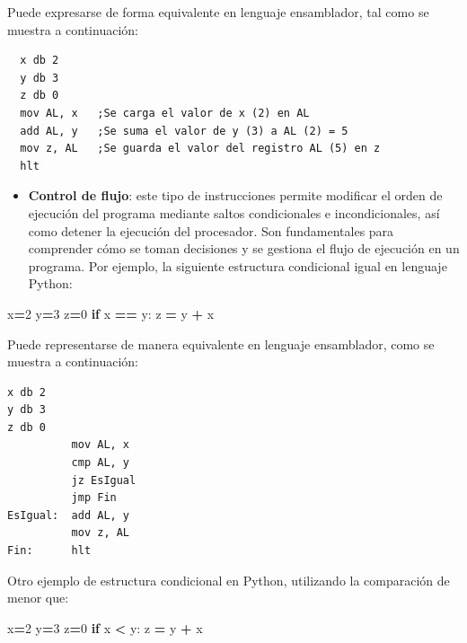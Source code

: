 \documentclass[12pt,oneside]{templates/unerthesis}
\newenvironment{Shaded}{\begin{snugshade}}{\end{snugshade}}
\newcommand{\ControlFlowTok}[1]{\textcolor[rgb]{0.13,0.29,0.53}{\textbf{#1}}}
\newcommand{\DecValTok}[1]{\textcolor[rgb]{0.00,0.00,0.81}{#1}}
\newcommand{\NormalTok}[1]{#1}
\newcommand{\OperatorTok}[1]{\textcolor[rgb]{0.81,0.36,0.00}{\textbf{#1}}}
\providecommand{\tightlist}{%
  \setlength{\itemsep}{0pt}\setlength{\parskip}{0pt}}
\begin{document}
Puede expresarse de forma equivalente en lenguaje ensamblador, tal como se muestra a continuación:

\begin{lstlisting}
  x db 2
  y db 3
  z db 0
  mov AL, x   ;Se carga el valor de x (2) en AL
  add AL, y   ;Se suma el valor de y (3) a AL (2) = 5
  mov z, AL   ;Se guarda el valor del registro AL (5) en z 
  hlt\end{lstlisting}

\begin{itemize}
\tightlist
\item
  \textbf{Control de flujo}: este tipo de instrucciones permite modificar el orden de ejecución del programa mediante saltos condicionales e incondicionales, así como detener la ejecución del procesador. Son fundamentales para comprender cómo se toman decisiones y se gestiona el flujo de ejecución en un programa. Por ejemplo, la siguiente estructura condicional igual en lenguaje Python:
\end{itemize}

\begin{Shaded}
\begin{Highlighting}[]
\NormalTok{x}\OperatorTok{=}\DecValTok{2}
\NormalTok{y}\OperatorTok{=}\DecValTok{3}
\NormalTok{z}\OperatorTok{=}\DecValTok{0}
\ControlFlowTok{if}\NormalTok{ x }\OperatorTok{==}\NormalTok{ y:}
\NormalTok{  z }\OperatorTok{=}\NormalTok{ y  }\OperatorTok{+}\NormalTok{ x}
\end{Highlighting}
\end{Shaded}

Puede representarse de manera equivalente en lenguaje ensamblador, como se muestra a continuación:

\begin{lstlisting}
x db 2 
y db 3
z db 0
          mov AL, x
          cmp AL, y
          jz EsIgual
          jmp Fin
EsIgual:  add AL, y
          mov z, AL 
Fin:      hlt\end{lstlisting}

Otro ejemplo de estructura condicional en Python, utilizando la comparación de menor que:

\begin{Shaded}
\begin{Highlighting}[]
\NormalTok{x}\OperatorTok{=}\DecValTok{2}
\NormalTok{y}\OperatorTok{=}\DecValTok{3}
\NormalTok{z}\OperatorTok{=}\DecValTok{0}
\ControlFlowTok{if}\NormalTok{ x }\OperatorTok{\textless{}}\NormalTok{ y:}
\NormalTok{  z }\OperatorTok{=}\NormalTok{ y  }\OperatorTok{+}\NormalTok{ x}
\end{Highlighting}
\end{Shaded}
\end{document}
